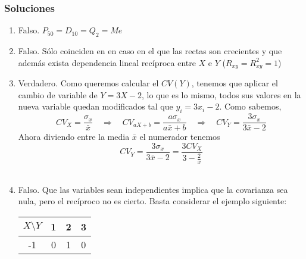 \documentclass[fleqn]{article}
\def\next{\quad \Rightarrow \quad}
\begin{document}
\begin{enumerate}
                \newpage

                \subsubsection{Soluciones}

                        \begin{enumerate}
                                \item Falso. $P_{50} = D_{10} = Q_2 = Me$\\
                                \item Falso. Sólo coinciden en en caso en el que las rectas son crecientes y que además exista dependencia 
                                                lineal recíproca entre $X$ e $Y$ ($R_{xy} = R_{xy}^2 = 1$) \\
                                \item Verdadero. Como queremos calcular el $CV(Y)$, tenemos que aplicar el cambio de variable 
                                                de $Y = 3X - 2$, lo que es lo mismo, todos sus valores en la nueva variable quedan modificados tal que 
                                                $y_i = 3x_i - 2$. Como sabemos, 
                                                $$CV_X = \frac{\sigma_x}{\bar{x}} \next CV_{aX+b} = \frac{a\sigma_x}{a\bar{x} + b} \next CV_Y = \frac{3\sigma_x}{3\bar{x} - 2}$$
                                                Ahora diviendo entre la media $\bar{x}$ el numerador tenemos
                                                $$CV_Y = \frac{3\sigma_x}{3\bar{x} - 2} = \frac{3CV_X}{3 - \frac{2}{\bar{x}}} $$\\
                                \item Falso. Que las variables sean independientes implica que la covarianza sea nula, pero el recíproco no 
                                                es cierto. Basta considerar el ejemplo siguiente: 
                                                \begin{center}
                                                        \begin{tabular}{c|c c c}
                                                                $X\setminus Y$ & 1 & 2 & 3 \\
                                                                \hline
                                                                -1 & 0 & 1 & 0 \\
                                                                

\end{tabular}
\end{center}
\end{enumerate}
\end{enumerate}
\end{document}
